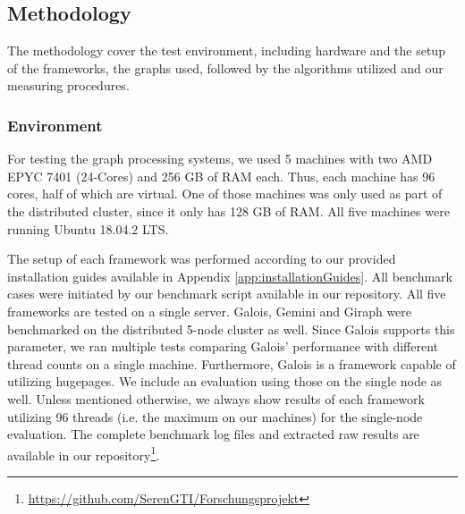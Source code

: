 

\subsection{Methodology}
The methodology cover the test environment, including hardware and the setup of the frameworks, the graphs used, followed by the algorithms utilized and our measuring procedures.

\subsubsection{Environment}
For testing the graph processing systems, we used 5 machines with two AMD EPYC 7401 (24-Cores) and 256 GB of RAM each. Thus, each machine has 96 cores, half of which are virtual. One of those machines was only used as part of the distributed cluster, since it only has 128 GB of RAM.
All five machines were running Ubuntu 18.04.2 LTS.

The setup of each framework was performed according to our provided installation guides available in Appendix \ref{app:installationGuides}.
All benchmark cases were initiated by our benchmark script available in our repository.
All five frameworks are tested on a single server.
Galois, Gemini and Giraph were benchmarked on the distributed 5-node cluster as well.
Since Galois supports this parameter, we ran multiple tests comparing Galois' performance with different thread counts on a single machine.
Furthermore, Galois is a framework capable of utilizing hugepages. We include an evaluation using those on the single node as well.
Unless mentioned otherwise, we always show results of each framework utilizing 96 threads (i.e. the maximum on our machines) for the single-node evaluation.
The complete benchmark log files and extracted raw results are available in our repository\footnote{\url{https://github.com/SerenGTI/Forschungsprojekt}}.


